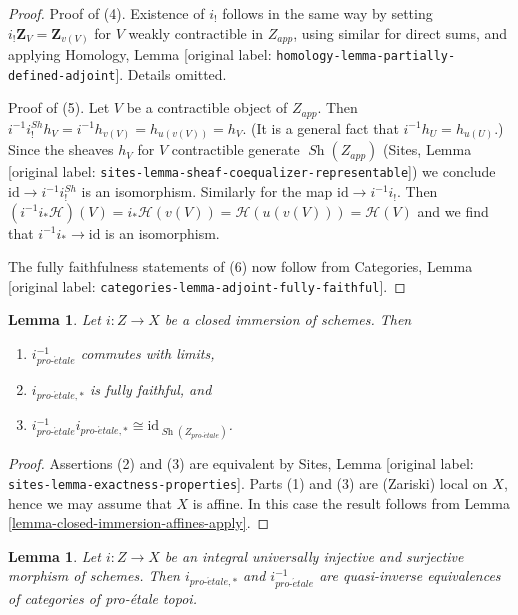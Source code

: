 \documentclass[10pt,a4paper]{article}
\theoremstyle{plain}
\newtheorem{lemma}[subsection]{Lemma}
\theoremstyle{definition}
\theoremstyle{remark}
\numberwithin{equation}{subsection}
\def\Sh{\mathop{\mathit{Sh}}\nolimits}
\def\proetale{{pro\text{-}\acute{e}tale}}
\begin{document}
\begin{proof}
\medskip\noindent
Proof of (4). Existence of $i_!$ follows in the same way by setting
$i_!\mathbf{Z}_V = \mathbf{Z}_{v(V)}$ for $V$ weakly contractible in $Z_{app}$,
using similar for direct sums, and applying
Homology, Lemma \textnormal{[original label: \nolinkurl{homology-lemma-partially-defined-adjoint}]}.
Details omitted.

\medskip\noindent
Proof of (5). Let $V$ be a contractible object of $Z_{app}$.
Then $i^{-1}i^{Sh}_!h_V = i^{-1}h_{v(V)} = h_{u(v(V))} = h_V$.
(It is a general fact that $i^{-1}h_U = h_{u(U)}$.) Since the
sheaves $h_V$ for $V$ contractible generate $\Sh(Z_{app})$
(Sites, Lemma \textnormal{[original label: \nolinkurl{sites-lemma-sheaf-coequalizer-representable}]})
we conclude $\text{id} \to i^{-1}i^{Sh}_!$ is an isomorphism.
Similarly for the map $\text{id} \to i^{-1}i_!$. Then
$(i^{-1}i_*\mathcal{H})(V) = i_*\mathcal{H}(v(V)) =
\mathcal{H}(u(v(V))) = \mathcal{H}(V)$ and we find that
$i^{-1}i_* \to \text{id}$ is an isomorphism.

\medskip\noindent
The fully faithfulness statements of (6) now follow from
Categories, Lemma \textnormal{[original label: \nolinkurl{categories-lemma-adjoint-fully-faithful}]}.
\end{proof}

\begin{lemma}
\label{lemma-closed-immersion}
Let $i : Z \to X$ be a closed immersion of schemes. Then
\begin{enumerate}
\item $i_\proetale^{-1}$ commutes with limits,
\item $i_{\proetale, *}$ is fully faithful, and
\item $i_\proetale^{-1}i_{\proetale, *} \cong \text{id}_{\Sh(Z_\proetale)}$.
\end{enumerate}
\end{lemma}

\begin{proof}
Assertions (2) and (3) are equivalent by
Sites, Lemma \textnormal{[original label: \nolinkurl{sites-lemma-exactness-properties}]}.
Parts (1) and (3) are (Zariski) local on $X$, hence we may assume that
$X$ is affine. In this case the result follows from
Lemma \ref{lemma-closed-immersion-affines-apply}.
\end{proof}

\begin{lemma}
\label{lemma-thickening}
Let $i : Z \to X$ be an integral universally injective and surjective morphism
of schemes. Then
$i_{\proetale, *}$ and $i_\proetale^{-1}$ are quasi-inverse
equivalences of categories of pro-\'etale topoi.
\end{lemma}
\end{document}
